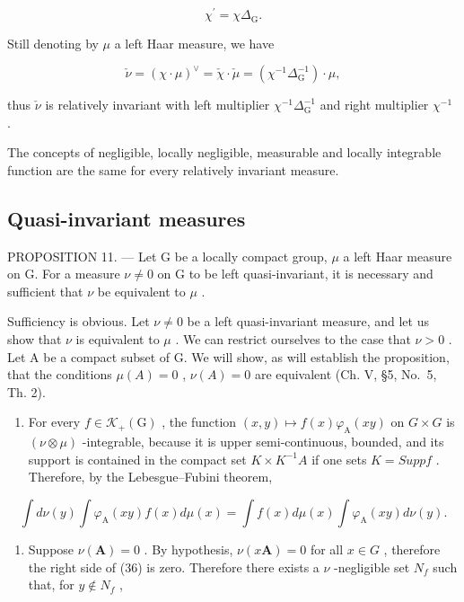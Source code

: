 \[
\chi^ {\prime} = \chi \Delta_ {\mathrm{G}}.\tag{35}
\]

Still denoting by \(\mu\) a left Haar measure, we have

\[
\check {\nu} = (\chi \cdot \mu) ^ {\vee} = \check {\chi} \cdot \check {\mu} = (\chi^ {- 1} \Delta_ {\mathrm{G}} ^ {- 1}) \cdot \mu ,
\]

thus \(\check{\nu}\) is relatively invariant with left multiplier \(\chi^{-1}\Delta_{\mathrm{G}}^{-1}\) and right multiplier \(\chi^{-1}\) .

The concepts of negligible, locally negligible, measurable and locally integrable function are the same for every relatively invariant measure.

\subsection{Quasi-invariant measures}

PROPOSITION 11. --- Let G be a locally compact group, \(\mu\) a left Haar measure on G. For a measure \(\nu \neq 0\) on G to be left quasi-invariant, it is necessary and sufficient that \(\nu\) be equivalent to \(\mu\) .

Sufficiency is obvious. Let \(\nu \neq 0\) be a left quasi-invariant measure, and let us show that \(\nu\) is equivalent to \(\mu\) . We can restrict ourselves to the case that \(\nu > 0\) . Let A be a compact subset of G. We will show, as will establish the proposition, that the conditions \(\mu(A) = 0\) , \(\nu(A) = 0\) are equivalent (Ch. V, §5, No.~5, Th. 2).

\begin{enumerate}
\def\labelenumi{\alph{enumi})}
\tightlist
\item
  For every \(f \in \mathcal{K}_{+}(\mathrm{G})\) , the function \((x, y) \mapsto f(x)\varphi_{\mathrm{A}}(xy)\) on \(G \times G\) is \((\nu \otimes \mu)\) -integrable, because it is upper semi-continuous, bounded, and its support is contained in the compact set \(K \times K^{-1}A\) if one sets \(K = Supp f\) . Therefore, by the Lebesgue--Fubini theorem,
\end{enumerate}

\[
\int d \nu (y) \int \varphi_ {\mathrm{A}} (x y) f (x) d \mu (x) = \int f (x) d \mu (x) \int \varphi_ {\mathrm{A}} (x y) d \nu (y).\tag{36}
\]

\begin{enumerate}
\def\labelenumi{\alph{enumi})}
\setcounter{enumi}{1}
\tightlist
\item
  Suppose \(\nu(\mathbf{A}) = 0\) . By hypothesis, \(\nu(x\mathbf{A}) = 0\) for all \(x \in G\) , therefore the right side of (36) is zero. Therefore there exists a \(\nu\) -negligible set \(N_{f}\) such that, for \(y \notin N_{f}\) ,
\end{enumerate}


